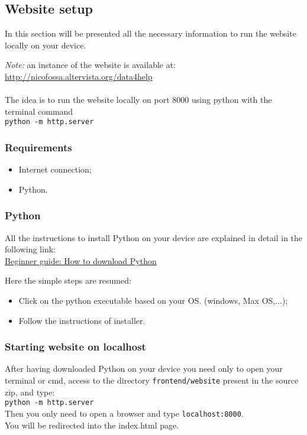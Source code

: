 \newpage 
\subsection{Website setup}
In this section will be presented all the necessary information to run the website locally on your device.

\noindent \textit{Note:} an instance of the website is available at: \\
\href{http://nicofossa.altervista.org/data4help}{http://nicofossa.altervista.org/data4help} \\
\\
The idea is to run the website locally  on port 8000 using python with the terminal command \\
\texttt{python -m http.server}

\subsubsection{Requirements}
\begin{itemize}
    \item Internet connection;
    \item Python.
\end{itemize}

\subsubsection{Python}
All the instructions to install Python on your device are explained in detail in the following link: \\
\href{https://wiki.python.org/moin/BeginnersGuide/Download}{Beginner guide: How to download Python}

Here the simple steps are resumed:
\begin{itemize}
    \item Click on the python executable based on your OS. (windows, Max OS,...);
    \item Follow the instructions of installer.
\end{itemize}

\subsubsection{Starting website on localhost}
After having downloaded Python on your device you need only to open your terminal or cmd, access to the directory \texttt{frontend/website} present in the source zip, and type:\\
\texttt{python -m http.server}\\

\noindent Then you only need to open a browser and type \texttt{localhost:8000}. \\
You will be redirected into the index.html page.